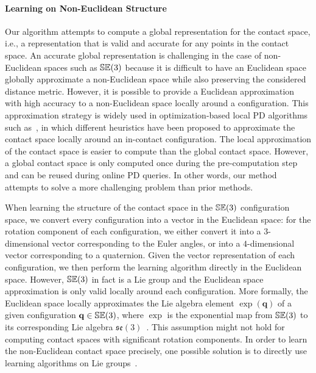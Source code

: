 \paragraph{Learning on Non-Euclidean Structure}
Our algorithm attempts to compute a global representation for the contact space, i.e., a representation that is valid and accurate for any points in the contact space. An accurate global representation is challenging in the case of non-Euclidean spaces such as $\mathbb {SE}(3)$ because it is difficult to have an Euclidean space globally approximate a non-Euclidean space while also preserving the considered distance metric. However, it is possible to provide a Euclidean approximation with high accuracy to a non-Euclidean space locally around a configuration. This approximation strategy is widely used in optimization-based local PD algorithms such as~\cite{Nawratil:2009:GPD,Zhang:2007:AFP,Je:2012:PRP,Tang:IGP:2013}, in which different heuristics have been proposed to approximate the contact space locally around an in-contact configuration. The local approximation of the contact space is easier to compute than the global contact space. However, a global contact space is only computed once during the pre-computation step and can be reused during online PD queries. In other words, our method attempts to solve a more challenging problem than prior methods.

When learning the structure of the contact space in the $\mathbb {SE}(3)$ configuration space, we convert every configuration into a vector in the Euclidean space: for the rotation component of each configuration, we either convert it into a $3$-dimensional vector corresponding to the Euler angles, or into a $4$-dimensional vector corresponding to a quaternion. Given the vector representation of each configuration, we then perform the learning algorithm directly in the Euclidean space. However, $\mathbb {SE}(3)$ in fact is a Lie group and the Euclidean space approximation is only valid locally around each configuration. More formally, the Euclidean space locally approximates the Lie algebra element $\exp(\mathbf q)$ of a given configuration $\mathbf q \in \mathbb {SE}(3)$, where $\exp$ is the exponential map from $\mathbb {SE}(3)$ to its corresponding Lie algebra $\mathfrak{se}(3)$~\cite{Murray:1994:MIR}. This assumption might not hold for computing contact spaces with significant rotation components. In order to learn the non-Euclidean contact space precisely, one possible solution is to directly use learning algorithms on Lie groups~\cite{Tuzel:2008:LLG}.


